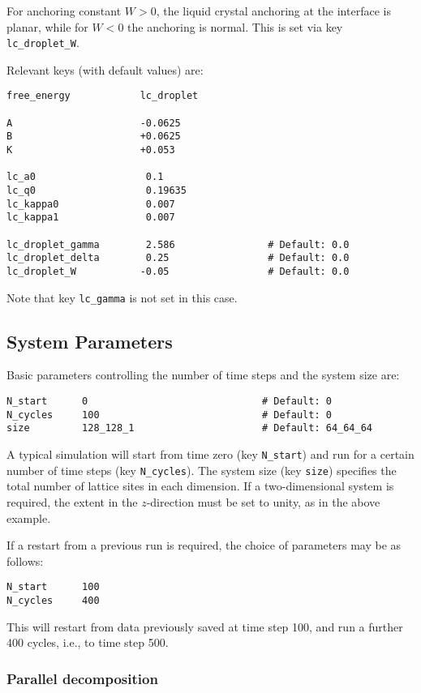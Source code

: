 For anchoring constant $W > 0$, the liquid crystal anchoring at the
interface is planar, while for $W < 0$ the anchoring is normal. This
is set via key \texttt{lc\_droplet\_W}.

Relevant keys (with default values) are:
\begin{lstlisting}
free_energy            lc_droplet

A                      -0.0625
B                      +0.0625
K                      +0.053

lc_a0                   0.1
lc_q0                   0.19635
lc_kappa0               0.007
lc_kappa1               0.007

lc_droplet_gamma        2.586                # Default: 0.0
lc_droplet_delta        0.25                 # Default: 0.0
lc_droplet_W           -0.05                 # Default: 0.0
\end{lstlisting}
Note that key \texttt{lc\_gamma} is not set in this case.

\subsection{System Parameters}
\label{input-system-parameters}

Basic parameters controlling the number of time steps
and the system size are:
\begin{lstlisting}
N_start      0                              # Default: 0
N_cycles     100                            # Default: 0
size         128_128_1                      # Default: 64_64_64
\end{lstlisting}
A typical simulation will start from time zero (key \texttt{N\_start})
and run for a certain number of time steps (key \texttt{N\_cycles}).
The system size (key \texttt{size}) specifies the total number of
lattice sites in each dimension. If a two-dimensional system is
required, the extent in the $z$-direction must be set to unity, as
in the above example.

If a restart from a previous run is required, the choice of parameters
may be as follows:
\begin{lstlisting}
N_start      100
N_cycles     400
\end{lstlisting}
This will restart from data previously saved at time step 100, and
run a further 400 cycles, i.e., to time step 500.

\subsubsection{Parallel decomposition}

